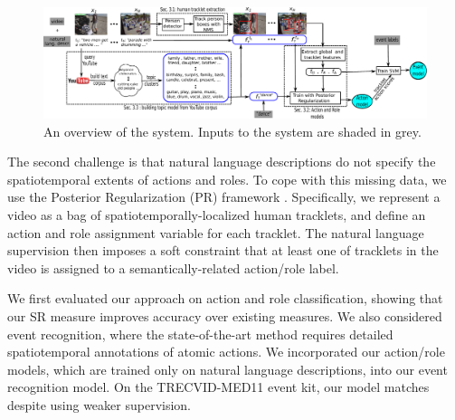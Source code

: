 \documentclass[10pt,twocolumn,letterpaper]{article}
\begin{document}
\begin{figure} 
  \includegraphics[scale = 0.44]{../images/system_e.pdf}
  \caption{An overview of the system. Inputs to the system are shaded in grey.}
\label{fig:system}
\end{figure}

The second challenge is that natural language descriptions do not specify the
spatiotemporal extents of actions and roles.
To cope with this missing data, we use the Posterior Regularization
(PR) framework \cite{Ganchev_JMLR10}.
Specifically, we represent a video as a
bag of spatiotemporally-localized human tracklets,
and define an action and role assignment variable for each tracklet.
The natural language supervision then imposes a soft constraint
that at least one of tracklets in the video is assigned to a semantically-related action/role label.


We first evaluated our approach on action and role classification,
showing that our SR measure improves accuracy over existing measures.
We also considered event recognition, where the state-of-the-art method \cite{Izadinia_ECCV12} requires
detailed spatiotemporal annotations of atomic actions.
We incorporated our action/role models, which are trained only on natural language descriptions,
into our event recognition model.
On the TRECVID-MED11 event kit,
our model matches \cite{Izadinia_ECCV12} despite using weaker supervision.
\end{document}
